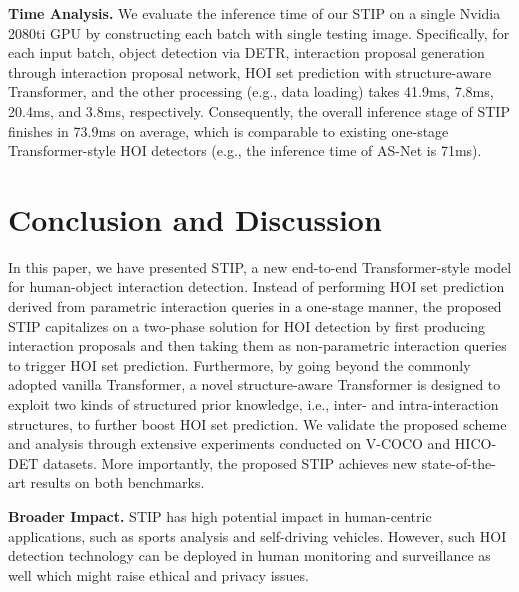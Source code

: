 \documentclass[10pt,twocolumn,letterpaper]{article}
\begin{document}
\textbf{Time Analysis.}
We evaluate the inference time of our STIP on a single Nvidia 2080ti GPU by constructing each batch with single testing image. Specifically, for each input batch, object detection via DETR, interaction proposal generation through interaction proposal network, HOI set prediction with structure-aware Transformer, and the other processing (e.g., data loading) takes 41.9ms, 7.8ms, 20.4ms, and 3.8ms, respectively. Consequently, the overall inference stage of STIP finishes in 73.9ms on average, which is comparable to existing one-stage Transformer-style HOI detectors (e.g., the inference time of AS-Net \cite{chen2021reformulating} is 71ms).


\section{Conclusion and Discussion}

In this paper, we have presented STIP, a new end-to-end Transformer-style model for human-object interaction detection. Instead of performing HOI set prediction derived from parametric interaction queries in a one-stage manner, the proposed STIP capitalizes on a two-phase solution for HOI detection by first producing interaction proposals and then taking them as non-parametric interaction queries to trigger HOI set prediction. Furthermore, by going beyond the commonly adopted vanilla Transformer, a novel structure-aware Transformer is designed to exploit two kinds of structured prior knowledge, i.e., inter- and intra-interaction structures, to further boost HOI set prediction. We validate the proposed scheme and analysis through extensive experiments conducted on V-COCO and HICO-DET datasets. More importantly, the proposed STIP achieves new state-of-the-art results on both benchmarks.

\textbf{Broader Impact.} STIP has high potential impact in human-centric applications, such as sports analysis and self-driving vehicles. However, such HOI detection technology can be deployed in human monitoring and surveillance as well which might raise ethical and privacy issues.

{\small


}
\end{document}
